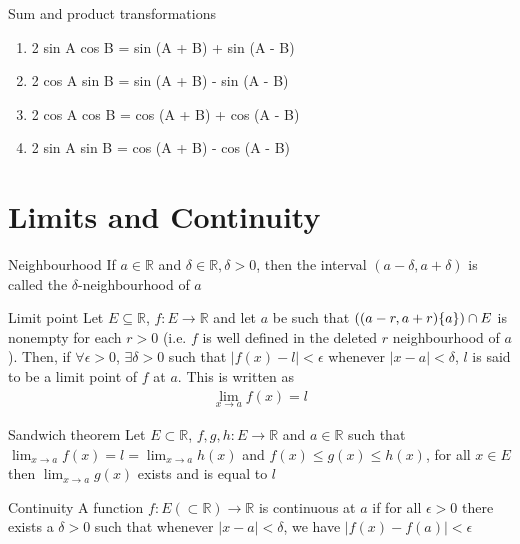 \documentclass[titlepage, 12pt]{book}
\begin{document}
\begin{theorem}{Sum and product transformations}{}
    \begin{enumerate}
        \item 2 sin A cos B = sin (A + B) + sin (A - B)
        \item 2 cos A sin B = sin (A + B) - sin (A - B)
        \item 2 cos A cos B = cos (A + B) + cos (A - B)
        \item 2 sin A sin B = cos (A + B) - cos (A - B)
    \end{enumerate}
\end{theorem}

\chapter{Limits and Continuity}

\begin{definition}{Neighbourhood}{}
    If $a\in\mathbb{R}$ and $\delta\in\mathbb{R}, \delta > 0$, then the interval
    $(a - \delta, a + \delta)$ is called the $\delta$-neighbourhood of $a$
\end{definition}

\begin{definition}{Limit point}{}
    Let $E\subseteq\mathbb{R}$, $f:E\rightarrow\mathbb{R}$ and let $a$ be such
    that $((a - r, a + r)\\ \{a\})\cap E$ is nonempty for each $r>0$ (i.e. $f$
    is well defined in the deleted $r$ neighbourhood of $a$). Then, if
    $\forall\epsilon > 0$, $\exists\delta > 0$ such that $|f(x) - l| <
    \epsilon$ whenever $|x - a| < \delta$, $l$ is said to be a limit point of
    $f$ at $a$. This is written as
    \begin{align*}
        \lim_{x\rightarrow a} f(x) = l
    \end{align*}
\end{definition}

\begin{theorem}{Sandwich theorem}{}
    Let $E\subset\mathbb{R}$, $f,g,h : E\rightarrow\mathbb{R}$ and
    $a\in\mathbb{R}$ such that $\lim_{x\rightarrow a}f(x) = l =
    \lim_{x\rightarrow a} h(x)$ and $f(x)\leq g(x)\leq h(x)$, for all $x\in E$
    then $\lim_{x\rightarrow a}g(x)$ exists and is equal to $l$
\end{theorem}

\begin{definition}{Continuity}{}
    A function $f:E(\subset\mathbb{R})\rightarrow\mathbb{R}$ is continuous at
    $a$ if for all $\epsilon > 0$ there exists a $\delta > 0$ such that whenever
    $|x - a| < \delta$, we have $|f(x) -f(a)| < \epsilon$
\end{definition}
\end{document}
